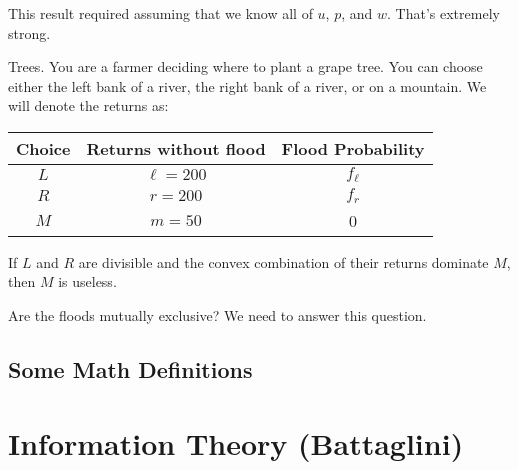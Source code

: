 \documentclass[12pt]{article}
\begin{document}
\begin{remark}
	This result required assuming that we know all of $u$, $p$, and $w$. That's extremely strong.
\end{remark}

\begin{example}
	Trees. You are a farmer deciding where to plant a grape tree. You can choose either the left bank of a river, the right bank of a river, or on a mountain. We will denote the returns as:
	
	\begin{table}[H]
		\centering
		\begin{tabular}{|c|c|c|}
			\hline
			Choice & Returns without flood & Flood Probability\\
			\hline 
			$L$ & $\ell = 200$ & $f_\ell$\\
			\hline
			$R$ & $r = 200$ & $f_r$ \\
			\hline 
			$M$ & $m = 50$ & 0 \\
			\hline 
		\end{tabular}
	\end{table}
\end{example}

\begin{remark}
	If $L$ and $R$ are divisible and the convex combination of their returns dominate $M$, then $M$ is useless.
\end{remark}

\begin{remark}
	Are the floods mutually exclusive? We need to answer this question.
\end{remark}














\subsection{Some Math Definitions}










\newpage
\section{Information Theory (Battaglini)}\label{sec:battaglini}
\end{document}
